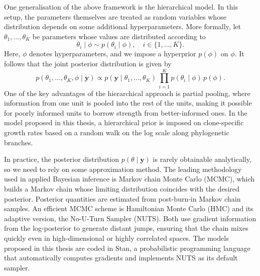 One generalisation of the above framework is the hierarchical model. In this setup, 
the parameters themselves are treated as random variables whose distribution depends 
on some additional hyperparameters. More formally, let $\theta_1, \ldots, \theta_K$ 
be parameters whose values are distributed according to
%
\begin{equation}
    \theta_i \mid \phi \sim p(\theta_i \mid \phi), \quad i \in \{1, \ldots, K\}.
\end{equation}
%
Here, $\phi$ denotes hyperparameters, and we impose a hyperprior $p(\phi)$ on $\phi$. 
It follows that the joint posterior distribution is given by
%
\begin{equation}
    p(\theta_1, \ldots, \theta_K, \phi \mid \mathbf{y}) \propto 
    p(\mathbf{y} \mid \theta_1, \ldots, \theta_K)\, 
    \prod_{i=1}^{K} p(\theta_i \mid \phi)\, p(\phi).
\end{equation}
%
One of the key advantages of the hierarchical approach is partial pooling, where 
information from one unit is pooled into the rest of the units, making it possible 
for poorly informed units to borrow strength from better-informed ones. In the model 
proposed in this thesis, a hierarchical prior is imposed on clone-specific growth 
rates based on a random walk on the log scale along phylogenetic branches.

In practice, the posterior distribution $p(\theta \mid \mathbf{y})$ is rarely 
obtainable analytically, so we need to rely on some approximation method. The 
leading methodology used in applied Bayesian inference is Markov chain Monte Carlo 
(MCMC), which builds a Markov chain whose limiting distribution coincides with the 
desired posterior. Posterior quantities are estimated from post-burn-in Markov chain 
samples. An efficient MCMC scheme is Hamiltonian Monte Carlo (HMC) and its adaptive 
version, the No-U-Turn Sampler (NUTS). Both use gradient information from the 
log-posterior to generate distant jumps, ensuring that the chain mixes quickly even 
in high-dimensional or highly correlated spaces. The models proposed in this thesis 
are coded in Stan, a probabilistic programming language that automatically computes 
gradients and implements NUTS as its default sampler.

